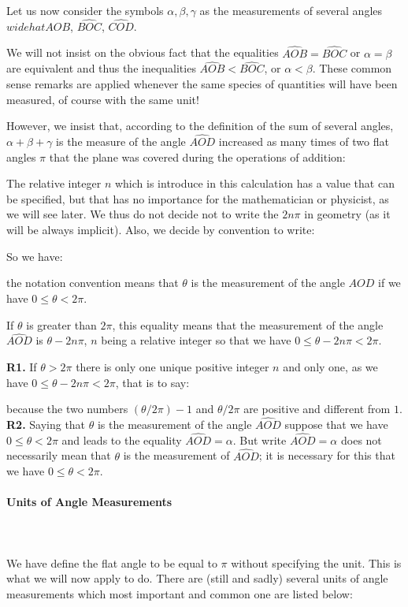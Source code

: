 	Let us now consider the symbols $\alpha,\beta,\gamma$ as the measurements of several angles $widehat{AOB}$, $\widehat{BOC}$, $\widehat{COD}$.

	We will not insist on the obvious fact that the equalities $\widehat{AOB}=\widehat{BOC}$ or $\alpha=\beta$ are equivalent and thus the  inequalities $\widehat{AOB}<\widehat{BOC}$, or $\alpha<\beta$. These common sense remarks are applied whenever the same species of quantities will have been measured, of course with the same unit!
	
	However, we insist that, according to the definition of the sum of several angles, $\alpha+\beta+\gamma$ is the measure of the angle $\widehat{AOD}$ increased as many times of two flat angles $\pi$ that the plane was covered during the operations of addition:
	
	The relative integer $n$ which is introduce in this calculation has a value that can be specified, but that has no importance for the mathematician or physicist, as we will see later. We thus do not decide not to write the $2n\pi$ in geometry (as it will be always implicit). Also, we decide by convention to write:
	
	So we have:
	
	the notation convention means that $\theta$ is the measurement of the angle $\widehat{AOD}$ if we have $0\leq \theta <2\pi$.
	
	If $\theta$ is greater than $2\pi$, this equality means that the measurement of the angle $\widehat{AOD}$ is $\theta-2n\pi$, $n$ being a relative integer so that we have $0 \leq \theta-2n\pi <2\pi$.
	\begin{tcolorbox}[title=Remarks,colframe=black,arc=10pt]
	\textbf{R1.} If $\theta>2\pi$ there is only one unique positive integer $n$ and only one, as we have $0\leq \theta-2n\pi<2\pi$, that is to say:
	
	because the two numbers $(\theta/2\pi)-1$ and $\theta/2\pi$ are positive and different from $1$.\\
	
	\textbf{R2.} Saying that $\theta$ is the measurement of the angle $\widehat{AOD}$ suppose that we have $0\leq \theta<2\pi$ and leads to the equality $\widehat{AOD}=\alpha$. But write $\widehat{AOD}=\alpha$ does not necessarily mean that $\theta$ is the measurement of $\widehat{AOD}$; it is necessary for this that we have $0\leq \theta<2\pi$.
	\end{tcolorbox}
	
	\paragraph{Units of Angle Measurements}\mbox{}\\\\
	We have define the flat angle to be equal to $\pi$ without specifying the unit. This is what we will now apply to do. There are (still and sadly) several units of angle measurements which most important and common one are listed below:

